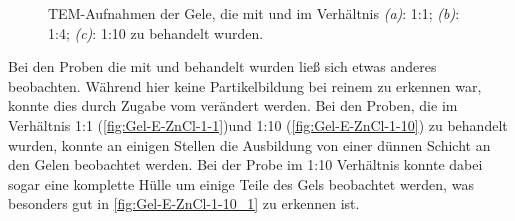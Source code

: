 		\begin{figure}[htbp]
			\centering
			\caption{TEM-Aufnahmen der Gele, die mit  und  im Verhältnis \emph{(a)}: 1:1; \emph{(b)}: 1:4; \emph{(c)}: 1:10  zu  behandelt wurden.}
			\label{fig:Gel-E-CdCl}
		\end{figure}
		
		Bei den Proben die mit  und  behandelt wurden ließ sich etwas anderes beobachten.
		Während hier keine Partikelbildung bei reinem  zu erkennen war, konnte dies durch Zugabe vom  verändert werden.
		Bei den Proben, die im Verhältnis 1:1 (\cref{fig:Gel-E-ZnCl-1-1})und 1:10 (\cref{fig:Gel-E-ZnCl-1-10})  zu  behandelt wurden, konnte an einigen Stellen die Ausbildung von einer dünnen Schicht an den Gelen beobachtet werden.
		Bei der Probe im 1:10 Verhältnis konnte dabei sogar eine komplette Hülle um einige Teile des Gels beobachtet werden, was besonders gut in \cref{fig:Gel-E-ZnCl-1-10_1} zu erkennen ist.
		
